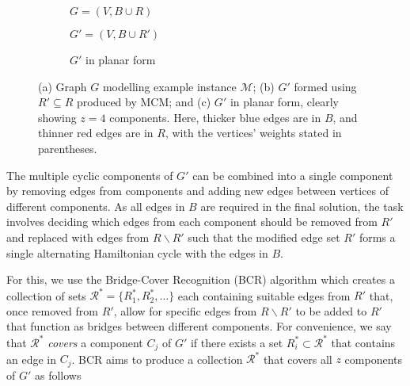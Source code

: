 \documentclass[authoryear]{elsarticle}
\begin{document}
\begin{figure}[H]	
	\centering
	\begin{subfigure}[h]{0.33\textwidth}
		
		\caption{$G = (V, B \cup R)$}
		\label{fig:threshold}
	\end{subfigure} \hspace{5mm}
	\begin{subfigure}[h]{0.33\textwidth}
		
		\caption{$G' = (V, B \cup R')$}
		\label{fig:matching}
	\end{subfigure} \hspace{7mm}
	\begin{subfigure}[h]{0.2\textwidth}
		
		\caption{$G'$ in planar form}
		\label{fig:mps}
	\end{subfigure}
	\caption{(a) Graph $G$ modelling example instance $\mathcal{M}$; (b) $G'$ formed using $R' \subseteq R$ produced by MCM; and (c) $G'$ in planar form, clearly showing $z = 4$ components. Here, thicker blue edges are in $B$, and thinner red edges are in $R$, with the vertices' weights stated in parentheses.}
	\label{fig:mcm}
\end{figure}

\noindent The multiple cyclic components of $G'$ can be combined into a single component by removing edges from components and adding new edges between vertices of different components. As all edges in $B$ are required in the final solution, the task involves deciding which edges from each component should be removed from $R'$ and replaced with edges from $R\backslash R'$ such that the modified edge set $R'$ forms a single alternating Hamiltonian cycle with the edges in $B$. 

For this, we use the Bridge-Cover Recognition (BCR) algorithm which creates a collection of sets $\mathcal{R}^* = \{R^*_1, R^*_2,\dots\}$ each containing suitable edges from $R'$ that, once removed from $R'$, allow for specific edges from $R\backslash R'$ to be added to $R'$ that function as bridges between different components. For convenience, we say that $\mathcal{R}^*$ \textit{covers} a component $C_j$ of $G'$ if there exists a set $R^*_i \subset \mathcal{R}^*$ that contains an edge in $C_j$. BCR aims to produce a collection $\mathcal{R}^*$ that covers all $z$ components of $G'$ as follows
\end{document}
